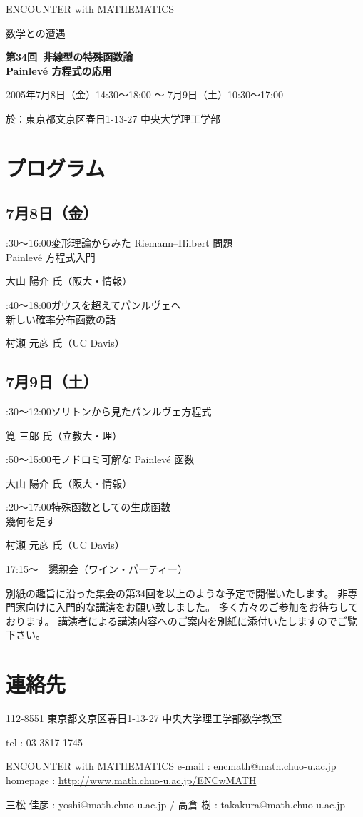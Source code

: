 \documentclass[uplatex,dvipdfmx]{jlreq}
\newcommand{\talk}[3]{%
\noindent
#1\quad #2\par
\hspace*{2em}#3\par\smallskip
}
\newcommand{\EwMnumber}{第34回}
\newcommand{\EwMtitle}{非線型の特殊函数論\\[2mm]\large Painlevé 方程式の応用}
\newcommand{\EwMdate}{2005年7月8日（金）14:30～18:00 ～ 7月9日（土）10:30～17:00}
\newcommand{\EwMplace}{東京都文京区春日1-13-27 中央大学理工学部}
\newcommand{\EwMtitleblock}{

\vspace*{-5mm}

\begin{center}

{\Large ENCOUNTER with MATHEMATICS}

\vspace{2mm}

{\large 数学との遭遇}

\vspace{4mm}

{\Large \bfseries \EwMnumber\ \EwMtitle}

\vspace{4mm}

\EwMdate

\vspace{2mm}

於：\EwMplace

\end{center}

\vspace{2mm}

}
\begin{document}
\EwMtitleblock


\section*{プログラム}

\subsection*{7月8日（金）}

\talk
{14:30～16:00}
{変形理論からみた Riemann–Hilbert 問題\\[1mm]Painlevé 方程式入門}
{大山 陽介 氏（阪大・情報）}

\talk
{16:40～18:00}
{ガウスを超えてパンルヴェへ\\[1mm]新しい確率分布函数の話}
{村瀬 元彦 氏（UC Davis）}

\subsection*{7月9日（土）}

\talk
{10:30～12:00}
{ソリトンから見たパンルヴェ方程式}
{筧 三郎 氏（立教大・理）}

\talk
{13:50～15:00}
{モノドロミ可解な Painlevé 函数}
{大山 陽介 氏（阪大・情報）}

\talk
{15:20～17:00}
{特殊函数としての生成函数\\[1mm]幾何を足す}
{村瀬 元彦 氏（UC Davis）}

\bigskip

17:15～　懇親会（ワイン・パーティー）


\bigskip

別紙の趣旨に沿った集会の第34回を以上のような予定で開催いたします。  
非専門家向けに入門的な講演をお願い致しました。  
多く方々のご参加をお待ちしております。  
講演者による講演内容へのご案内を別紙に添付いたしますのでご覧下さい。


\section*{連絡先}

112-8551 東京都文京区春日1-13-27 中央大学理工学部数学教室 

tel : 03-3817-1745  

ENCOUNTER with MATHEMATICS  
e-mail : encmath@math.chuo-u.ac.jp  
homepage : \url{http://www.math.chuo-u.ac.jp/ENCwMATH}  

三松 佳彦 : yoshi@math.chuo-u.ac.jp / 高倉 樹 : takakura@math.chuo-u.ac.jp
\end{document}

